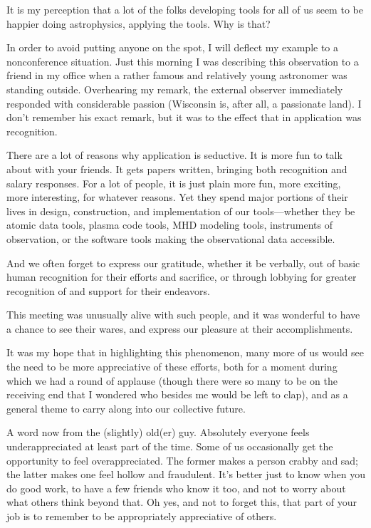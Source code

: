 \documentclass[proceedings]{rmaa}
\begin{document}
It is my perception that a lot of the folks developing tools for all of 
us seem to be happier doing astrophysics, applying the tools.  Why is that?

        In order to avoid putting anyone on the spot, I will deflect my 
example to a nonconference situation.  Just this morning I was describing 
this observation to a friend in my office when a rather famous and 
relatively young astronomer was standing outside.  Overhearing my remark, 
the external observer immediately responded with considerable passion 
(Wisconsin is, after all, a passionate land).  I don't remember his exact 
remark, but it was to the effect that in application was recognition.

        There are a lot of reasons why application is seductive.  It is 
more fun to talk about with your friends.  It gets papers written, 
bringing both recognition and salary responses.  For a lot of people, it  
is just plain more fun, more exciting, more interesting, for whatever 
reasons.  Yet they spend major portions of their lives in design, 
construction, and implementation of our tools---whether they be atomic 
data tools, plasma code tools, MHD modeling tools, instruments of 
observation, or the software tools making the observational data accessible.

        And we often forget to express our gratitude, whether it be 
verbally, out of basic human recognition for their efforts and sacrifice, 
or through lobbying for greater recognition of and support for their 
endeavors.

        This meeting was unusually alive with such people, and it was 
wonderful to have a chance to see their wares, and express our pleasure 
at their accomplishments.  

        It was my hope that in highlighting this phenomenon, many more of 
us would see the need to be more appreciative of these efforts, both for  
a moment during which we had a round of applause (though there were so 
many to be on the receiving end that I wondered who besides me would be 
left to clap), and as a general theme to carry along into our collective  
future.

A word now from the (slightly) old(er) guy.  Absolutely everyone feels 
underappreciated at least part of the time.  Some of us occasionally get  
the opportunity to feel overappreciated.  The former makes a person 
crabby and sad; the latter makes one feel hollow and fraudulent.  It's 
better just to know when you do good work, to have a few friends who know 
it too, and not to worry about what others think beyond that.  Oh yes, 
and not to forget this, that part of your job is to remember to be 
appropriately appreciative of others.
\vspace*{-0.5ex}
\end{document}
